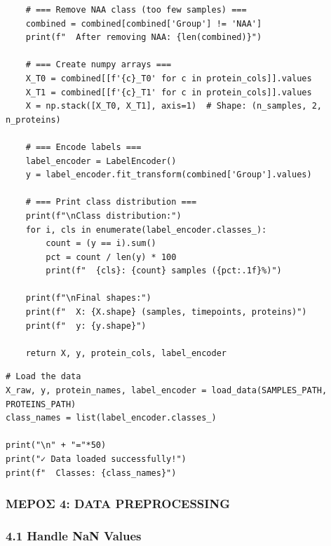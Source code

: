 \begin{lstlisting}
    # === Remove NAA class (too few samples) ===
    combined = combined[combined['Group'] != 'NAA']
    print(f"  After removing NAA: {len(combined)}")
 
    # === Create numpy arrays ===
    X_T0 = combined[[f'{c}_T0' for c in protein_cols]].values
    X_T1 = combined[[f'{c}_T1' for c in protein_cols]].values
    X = np.stack([X_T0, X_T1], axis=1)  # Shape: (n_samples, 2, n_proteins)
 
    # === Encode labels ===
    label_encoder = LabelEncoder()
    y = label_encoder.fit_transform(combined['Group'].values)
 
    # === Print class distribution ===
    print(f"\nClass distribution:")
    for i, cls in enumerate(label_encoder.classes_):
        count = (y == i).sum()
        pct = count / len(y) * 100
        print(f"  {cls}: {count} samples ({pct:.1f}%)")
 
    print(f"\nFinal shapes:")
    print(f"  X: {X.shape} (samples, timepoints, proteins)")
    print(f"  y: {y.shape}")
 
    return X, y, protein_cols, label_encoder
\end{lstlisting}
 
\begin{lstlisting}
# Load the data
X_raw, y, protein_names, label_encoder = load_data(SAMPLES_PATH, PROTEINS_PATH)
class_names = list(label_encoder.classes_)
 
print("\n" + "="*50)
print("✓ Data loaded successfully!")
print(f"  Classes: {class_names}")
\end{lstlisting}
 
\subsubsection*{ΜΕΡΟΣ 4: DATA PREPROCESSING}
 
\subsubsection*{4.1 Handle NaN Values}
 
